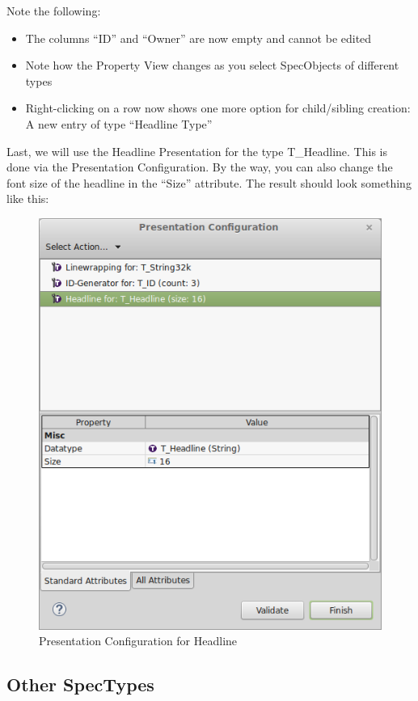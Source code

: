 Note the following:

\begin{itemize}
\item
  The columns ``ID'' and ``Owner'' are now empty and cannot be edited
\item
  Note how the Property View changes as you select SpecObjects of different types
\item
  Right-clicking on a row now shows one more option for child/sibling creation: A new entry of type ``Headline Type''
\end{itemize}

Last, we will use the Headline Presentation for the type T\_Headline.  This is done via the Presentation Configuration.  By the way, you can also change the font size of the headline in the ``Size'' attribute.  The result should look something like this:

\begin{figure}[h!]
\centering      
\includegraphics[width=0.8\linewidth]{../rmf-images/Presentation_headline.png}      
\caption{Presentation Configuration for Headline}      
\label{fig:headlineConfig2}
\end{figure}

\subsection{Other SpecTypes}

